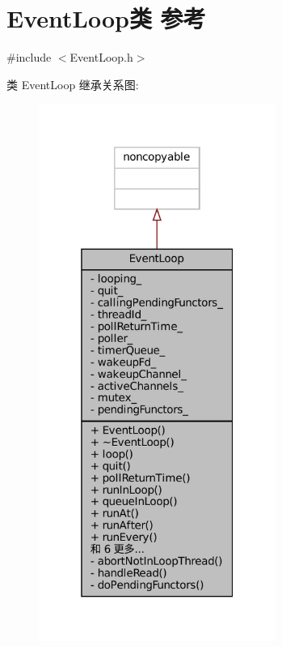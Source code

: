 \hypertarget{classmuduo_1_1EventLoop}{}\section{Event\+Loop类 参考}
\label{classmuduo_1_1EventLoop}


{\ttfamily \#include $<$Event\+Loop.\+h$>$}



类 Event\+Loop 继承关系图\+:
\nopagebreak
\begin{figure}[H]
\begin{center}
\leavevmode
\includegraphics[width=220pt]{classmuduo_1_1EventLoop__inherit__graph}
\end{center}
\end{figure}


